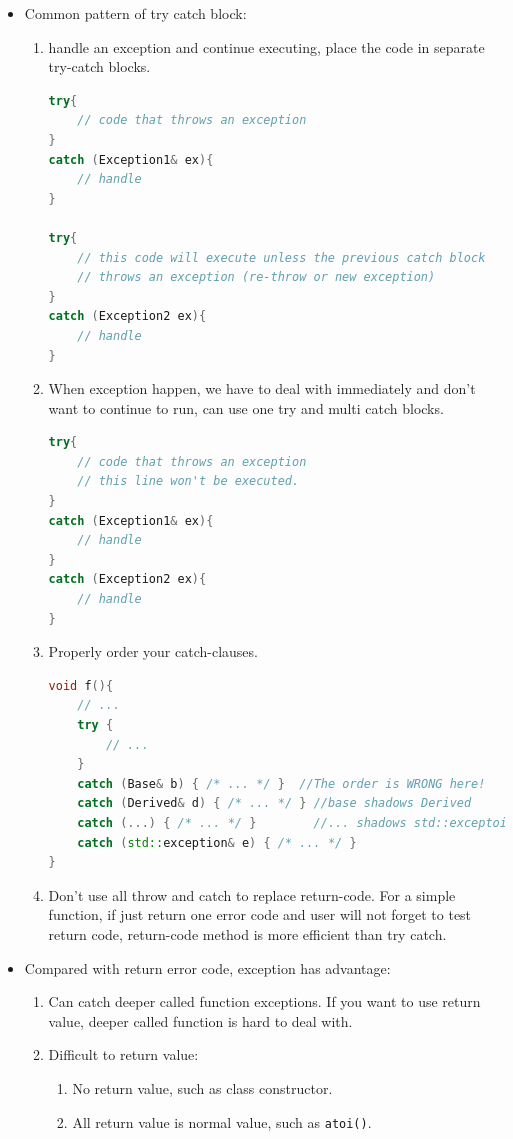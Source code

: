 \documentclass[a4paper,11pt,twoside]{book}
\begin{document}
\begin{itemize}
	\item Common pattern of try catch block:
\begin{enumerate}
	 \item handle an exception and continue executing, place the code in separate try-catch blocks. 

\begin{lstlisting}[frame=single, language=c++]
try{ 
	// code that throws an exception	
}
catch (Exception1& ex){
	// handle
}

try{ 
	// this code will execute unless the previous catch block 
	// throws an exception (re-throw or new exception) 
}
catch (Exception2 ex){
	// handle
}		
\end{lstlisting}

	\item When exception happen, we have to deal with immediately and don't want to continue to run, can use one try and multi catch blocks. 
\begin{lstlisting}[frame=single, language=c++]
try{ 
	// code that throws an exception	
	// this line won't be executed. 
}
catch (Exception1& ex){
	// handle
}
catch (Exception2 ex){
	// handle
}			
\end{lstlisting}	
	
	
	\item Properly order your catch-clauses.
\begin{lstlisting}[frame=single, language=c++]
void f(){
	// ...
	try {
		// ...
	}
	catch (Base& b) { /* ... */ }  //The order is WRONG here!
	catch (Derived& d) { /* ... */ } //base shadows Derived
	catch (...) { /* ... */ }        //... shadows std::exceptoin&
	catch (std::exception& e) { /* ... */ }
}
\end{lstlisting}	

	\item Don't use all throw and catch to replace return-code. For a simple function, if just return one error code and user will not forget to test return code, return-code method is more efficient than try catch. 
\end{enumerate}
	
	\item Compared with return error code, exception has advantage:
	\begin{enumerate}
		\item  Can catch deeper called function exceptions. If you want to use return value, deeper called function is hard to deal with.
		
		\item Difficult to return value: 
		\begin{enumerate}
			\item No return value, such as class constructor.
			\item All return value is normal value, such as \texttt{atoi()}.
		\end{enumerate}
		

\end{enumerate}
\end{itemize}
\end{document}
